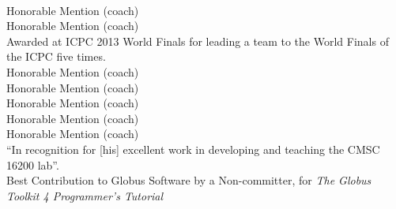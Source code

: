 \documentclass{resume}
\begin{document}
\begin{category}{}
\\Honorable Mention (coach)
\\Honorable Mention (coach)
\\Awarded at ICPC 2013 World Finals for leading a team to the World Finals of the ICPC five times.
\\Honorable Mention (coach)
\\Honorable Mention (coach)
\\Honorable Mention (coach)
\\Honorable Mention (coach)
\\Honorable Mention (coach)
\\``In recognition for [his] excellent work in developing and teaching the CMSC 16200 lab''.
\\Best Contribution to Globus Software by a Non-committer, for \emph{The Globus Toolkit 4 Programmer's Tutorial}
\end{category}
\end{document}
